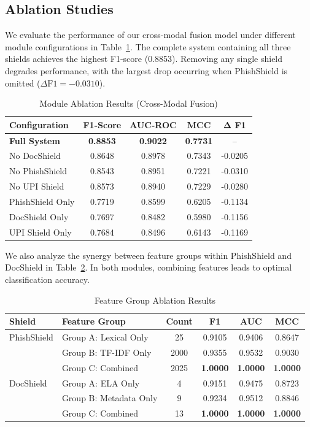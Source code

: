 \documentclass[journal]{IEEEtran}
\begin{document}
\subsection{Ablation Studies}
We evaluate the performance of our cross-modal fusion model under different module configurations in Table~\ref{tab:module_ablation}. The complete system containing all three shields achieves the highest F1-score (0.8853). Removing any single shield degrades performance, with the largest drop occurring when PhishShield is omitted ($\Delta \text{F1} = -0.0310$).

\begin{table}[!h]
\centering
\caption{Module Ablation Results (Cross-Modal Fusion)}
\label{tab:module_ablation}
\begin{tabular}{lcccc}
\toprule
\textbf{Configuration} & \textbf{F1-Score} & \textbf{AUC-ROC} & \textbf{MCC} & $\mathbf{\Delta}$ \textbf{F1} \\
\midrule
\textbf{Full System} & \textbf{0.8853} & \textbf{0.9022} & \textbf{0.7731} & -- \\
No DocShield & 0.8648 & 0.8978 & 0.7343 & -0.0205 \\
No PhishShield & 0.8543 & 0.8951 & 0.7221 & -0.0310 \\
No UPI Shield & 0.8573 & 0.8940 & 0.7229 & -0.0280 \\
PhishShield Only & 0.7719 & 0.8599 & 0.6205 & -0.1134 \\
DocShield Only & 0.7697 & 0.8482 & 0.5980 & -0.1156 \\
UPI Shield Only & 0.7684 & 0.8496 & 0.6143 & -0.1169 \\
\bottomrule
\end{tabular}
\end{table}

We also analyze the synergy between feature groups within PhishShield and DocShield in Table~\ref{tab:feature_group_ablation}. In both modules, combining features leads to optimal classification accuracy.

\begin{table}[!h]
\centering
\caption{Feature Group Ablation Results}
\label{tab:feature_group_ablation}
\begin{tabular}{llcccc}
\toprule
\textbf{Shield} & \textbf{Feature Group} & \textbf{Count} & \textbf{F1} & \textbf{AUC} & \textbf{MCC} \\
\midrule
PhishShield & Group A: Lexical Only & 25 & 0.9105 & 0.9406 & 0.8647 \\
& Group B: TF-IDF Only & 2000 & 0.9355 & 0.9532 & 0.9030 \\
& Group C: Combined & 2025 & \textbf{1.0000} & \textbf{1.0000} & \textbf{1.0000} \\
\midrule
DocShield & Group A: ELA Only & 4 & 0.9151 & 0.9475 & 0.8723 \\
& Group B: Metadata Only & 9 & 0.9234 & 0.9512 & 0.8846 \\
& Group C: Combined & 13 & \textbf{1.0000} & \textbf{1.0000} & \textbf{1.0000} \\
\bottomrule
\end{tabular}
\end{table}
\end{document}
